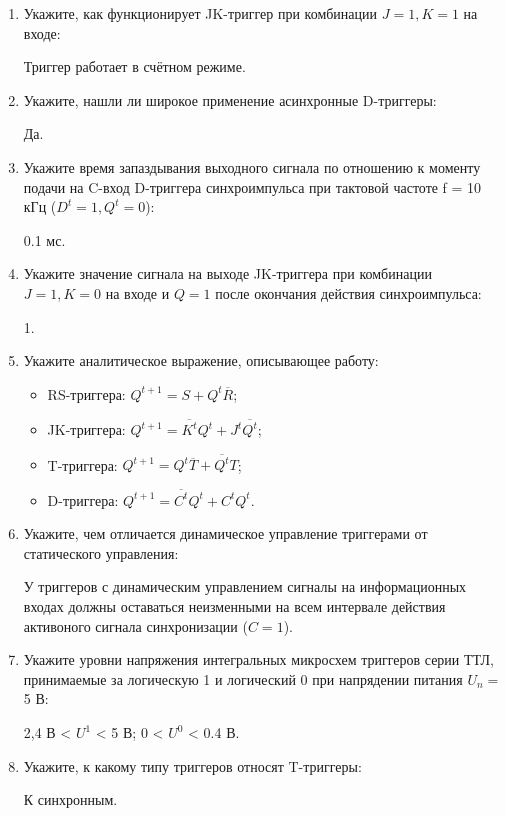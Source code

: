 \documentclass[spec, och, labwork]{shiza}
\begin{document}
\begin{enumerate}
    \item Укажите, как функционирует JK-триггер при комбинации $J = 1, K = 1$ на входе:
    
        Триггер работает в счётном режиме.

    \item Укажите, нашли ли широкое применение асинхронные D-триггеры:
    
        Да.
    
    \item Укажите время запаздывания выходного сигнала по отношению к моменту подачи на C-вход D-триггера
    синхроимпульса при тактовой частоте f = 10 кГц ($D^t = 1, Q^t = 0$):

        0.1 мс.
    
    \item Укажите значение сигнала на выходе JK-триггера при комбинации $J = 1, K = 0$ на входе и $Q = 1$ после окончания действия синхроимпульса:

        1.
    
    \item Укажите аналитическое выражение, описывающее работу:
        \begin{itemize}
            \item RS-триггера: $Q^{t+1} = S + Q^t \overline{R}$;
            \item JK-триггера: $Q^{t+1} = \overline{K^t} Q^t + J^t \overline{Q^t}$;
            \item T-триггера: $Q^{t+1} = Q^t \overline{T} + \overline{Q^t} T$;
            \item D-триггера: $Q^{t+1} = \overline{C^t} Q^t + C^t Q^t$.
        \end{itemize}
    
    \item Укажите, чем отличается динамическое управление триггерами от статического управления:
    
        У триггеров с динамическим управлением сигналы на информационных входах должны оставаться неизменными на всем интервале действия активоного сигнала синхронизации ($C = 1$).
    
    \item Укажите уровни напряжения интегральных микросхем триггеров серии ТТЛ, принимаемые за логическую 1 и логический 0 при напрядении питания $U_n = $ 5 В:

        2,4 В < $U^1$ < 5 В; 0 < $U^0$ < 0.4 В.

    \item Укажите, к какому типу триггеров относят T-триггеры:

        К синхронным.

\end{enumerate}
\end{document}
